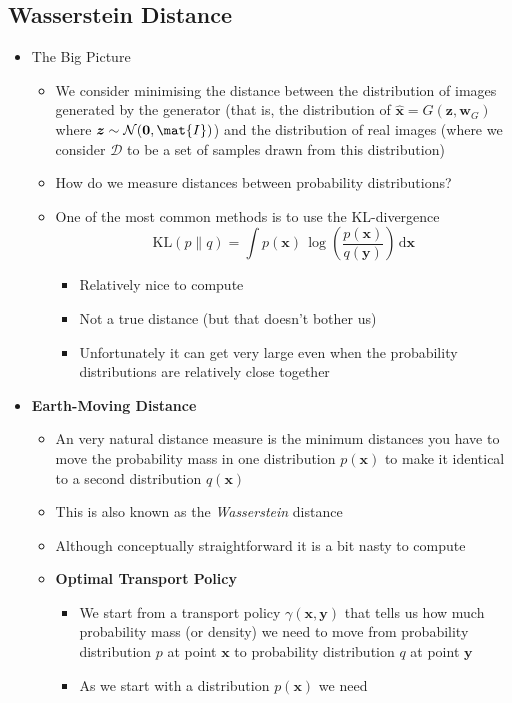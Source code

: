 \documentclass[11pt]{article}
\newcommand{\logg}[1]{\log\!\left( #1 \right)}
\newcommand{\dd}{\mathrm{d}}
\begin{document}
\subsection{Wasserstein Distance}
\label{sec:org726b08a}
\begin{itemize}
\item The Big Picture
\begin{itemize}
\item We consider minimising the distance between the distribution of
images generated by the generator (that is, the distribution of
\(\hat{\bm{x}} = G(\bm{z}, \bm{w}_G)\) where
\(\bm{z} \sim \mathcal{N}(\bm{0}, \mat{I})\)) and the distribution of real
images (where we consider \(\mathcal{D}\) to be a set of samples
drawn from this distribution)
\item How do we measure distances between probability distributions?
\item One of the most common methods is to use the KL-divergence
$$ \mathrm{KL}(p\|q) = \int p(\bm{x}) \,
	\logg{\frac{p(\bm{x})}{q(\bm{y})}} \, \dd \bm{x} $$
\begin{itemize}
\item Relatively nice to compute
\item Not a true distance (but that doesn't bother us)
\item Unfortunately it can get very large even when the probability
distributions are relatively close together
\end{itemize}
\end{itemize}
\item \textbf{Earth-Moving Distance}
\begin{itemize}
\item An very natural distance measure is the minimum distances you
have to move the probability mass in one distribution
\(p(\bm{x})\) to make it identical to a second distribution \(q(\bm{x})\)
\item This is also known as the \emph{Wasserstein} distance
\item Although conceptually straightforward it is a bit nasty to compute
\item \textbf{Optimal Transport Policy}
\begin{itemize}
\item We start from a transport policy \(\gamma(\bm{x},\bm{y})\) that
tells us how much probability mass (or density) we need to move
from probability distribution \(p\) at point \(\bm{x}\) to
probability distribution \(q\) at point \(\bm{y}\)
\item As we start with a distribution \(p(\bm{x})\) we need

\end{itemize}
\end{itemize}
\end{itemize}
\end{document}
